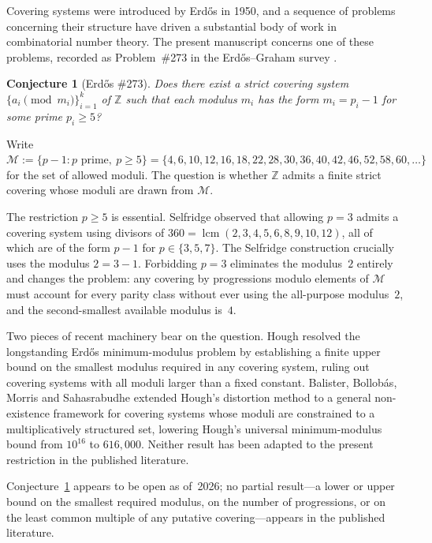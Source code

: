 \documentclass[11pt,a4paper]{article}
\theoremstyle{plain}
\newtheorem{conjecture}[theorem]{Conjecture}
\theoremstyle{definition}
\theoremstyle{remark}
\begin{document}
Covering systems were introduced by Erdős in 1950, and a sequence
of problems concerning their structure have driven a substantial
body of work in combinatorial number theory. The present manuscript
concerns one of these problems, recorded as Problem~\#273 in the
Erdős--Graham survey \cite{ErdosGraham1980}.

\begin{conjecture}[Erdős \#273]
\label{conj:e273}
Does there exist a strict covering system $\{ a_i \pmod{m_i}
\}_{i=1}^{k}$ of\/ $\mathbb{Z}$ such that each modulus $m_i$ has the
form $m_i = p_i - 1$ for some prime $p_i \geq 5$?
\end{conjecture}

Write $\mathcal{M} := \{ p - 1 : p \text{ prime}, \ p \geq 5 \} =
\{4, 6, 10, 12, 16, 18, 22, 28, 30, 36, 40, 42, 46, 52, 58, 60, \ldots\}$
for the set of allowed moduli. The question is whether $\mathbb{Z}$
admits a finite strict covering whose moduli are drawn from
$\mathcal{M}$.

The restriction $p \geq 5$ is essential. Selfridge observed that
allowing $p = 3$ admits a covering system using divisors of
$360 = \operatorname{lcm}(2,3,4,5,6,8,9,10,12)$, all of which are of
the form $p - 1$ for $p \in \{3, 5, 7\}$. The Selfridge construction
crucially uses the modulus $2 = 3 - 1$. Forbidding $p = 3$
eliminates the modulus~$2$ entirely and changes the problem: any
covering by progressions modulo elements of $\mathcal{M}$ must
account for every parity class without ever using the all-purpose
modulus~$2$, and the second-smallest available modulus is~$4$.

Two pieces of recent machinery bear on the question. Hough
\cite{Hough2015} resolved the longstanding Erdős minimum-modulus
problem by establishing a finite upper bound on the smallest modulus
required in any covering system, ruling out covering systems with all
moduli larger than a fixed constant. Balister, Bollobás, Morris and
Sahasrabudhe \cite{BBMS2022} extended Hough's distortion method to a
general non-existence framework for covering systems whose moduli are
constrained to a multiplicatively structured set, lowering Hough's
universal minimum-modulus bound from $10^{16}$ to $616{,}000$. Neither
result has been adapted to the present restriction in the published
literature.

Conjecture~\ref{conj:e273} appears to be open as of~2026; no partial
result---a lower or upper bound on the smallest required modulus, on
the number of progressions, or on the least common multiple of any
putative covering---appears in the published literature.
\end{document}
